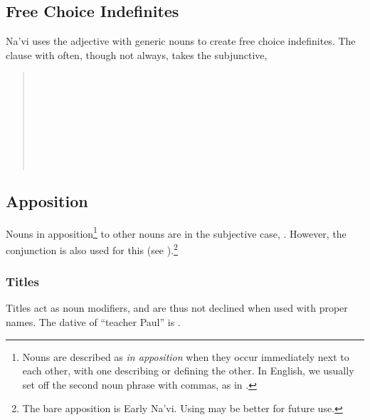 \subsection{Free Choice Indefinites} Na'vi uses the adjective
  with generic nouns to
create free choice indefinites.  The clause with  often,
though not always, takes the subjunctive,

\begin{quotation}
\noindent{}\\
\indent{}\\
\noindent{}\\
\indent{}\\
\noindent{}\\
\indent{}\\
\noindent{}\\
\indent{}
\end{quotation}
\noindent{}

\subsection{Apposition} Nouns in apposition\footnote{Nouns are
described as \textit{in apposition} when they occur immediately next
to each other, with one describing or defining the other.  In English,
we usually set off the second noun phrase with commas, as in .}
to other nouns are in the subjective case,  .  However, the con\-junct\-ion  is
also used for this (see ).\footnote{The bare
apposition is Early Na'vi.  Using  may be better for future
use.} 

\subsubsection{Titles} Titles act as noun modifiers, and are thus not
declined when used with proper names.  The dative of 
``teacher Paul'' is . 

